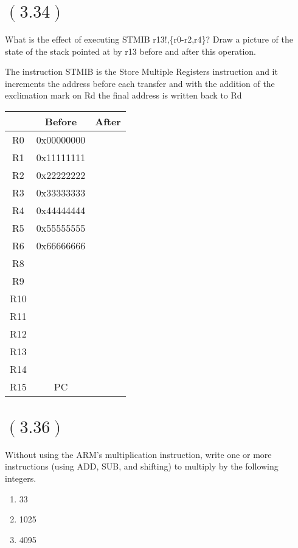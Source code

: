 \documentclass[letterpaper,12pt,titlepage]{article}
\begin{document}
\section*{$(3.34)$} What is the effect of executing STMIB r13!,\{r0-r2,r4\}? Draw a picture of the state of the stack pointed at by r13 before and after this operation.
\begin{mdframed}[style=MyFrame]

The instruction STMIB is the Store Multiple Registers instruction and it increments the address before each transfer and with the addition of the exclimation mark on Rd the final address is written back to Rd \\

\begin{center}
\begin{tabular}{| c | c | c |}
\hline
& Before & After\\ \hline \hline
R0 & 0x00000000  &\\ \hline
R1 & 0x11111111  &\\ \hline
R2 & 0x22222222  &\\ \hline
R3 & 0x33333333  &\\ \hline
R4 & 0x44444444  &\\ \hline
R5 & 0x55555555  &\\ \hline
R6 & 0x66666666  &\\ \hline
R8 &  &\\ \hline
R9 &  &\\ \hline
R10 &  &\\ \hline
R11 &  &\\ \hline 
R12 &  &\\ \hline
R13 &  &\\ \hline
R14 &  &\\ \hline
R15 & PC&\\ \hline
\end{tabular}
\end{center}
\end{mdframed}

\section*{$(3.36)$} Without using the ARM's multiplication instruction, write one or more instructions (using ADD, SUB, and shifting) to multiply by the following integers.

\begin{enumerate}[label=\Alph*]
\item 33
\item 1025
\item 4095
\end{enumerate}
\end{document}
